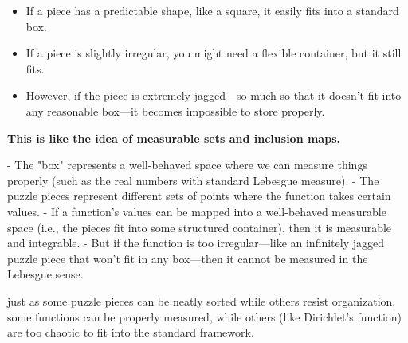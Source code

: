 \begin{itemize}
    \item If a piece has a predictable shape, like a square, it easily fits into a standard box.
    \item If a piece is slightly irregular, you might need a flexible container, but it still fits.
    \item However, if the piece is extremely jagged—so much so that it doesn’t fit into any reasonable box—it becomes impossible to store properly.
\end{itemize}

\textbf{This is like the idea of measurable sets and inclusion maps.} 

- The "box" represents a well-behaved space where we can measure things properly (such as the real numbers with standard Lebesgue measure).
- The puzzle pieces represent different sets of points where the function takes certain values.
- If a function’s values can be mapped into a well-behaved measurable space (i.e., the pieces fit into some structured container), then it is measurable and integrable.
- But if the function is too irregular—like an infinitely jagged puzzle piece that won’t fit in any box—then it cannot be measured in the Lebesgue sense.

 just as some puzzle pieces can be neatly sorted while others resist organization, some functions can be properly measured, while others (like Dirichlet’s function) are too chaotic to fit into the standard framework.
 
 \begin{center}
\end{center}

